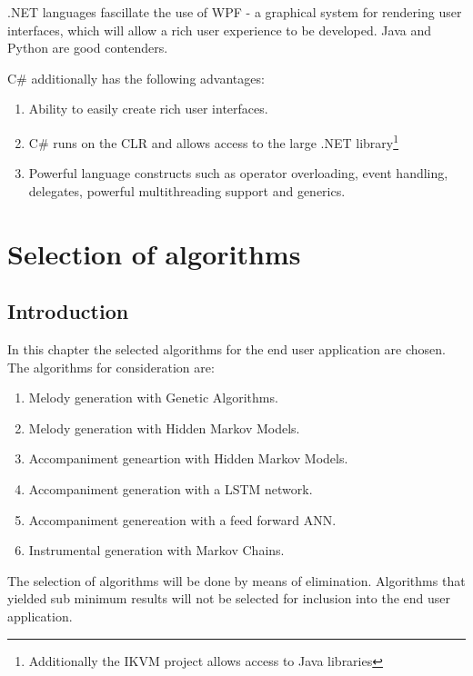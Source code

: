 .NET languages fascillate the use of \ac{WPF} - a graphical system for rendering user interfaces, which will allow a rich user experience to be developed. Java and Python are good contenders.

C\# additionally has the following advantages:
\begin{enumerate}
\item Ability to easily create rich user interfaces.
\item C\# runs on the CLR and allows access to the large .NET library\footnote{Additionally the IKVM project allows access to Java libraries}
\item Powerful language constructs such as operator overloading, event handling, delegates, powerful multithreading support and generics.
\end{enumerate}


\chapter{Selection of algorithms}
\section{Introduction}
In this chapter the selected algorithms for the end user application are chosen.
The algorithms for consideration are:
\begin{enumerate}
\item Melody generation with Genetic Algorithms.
\item Melody generation with Hidden Markov Models.
\item Accompaniment geneartion with Hidden Markov Models.
\item Accompaniment generation with a \ac{LSTM} network.
\item Accompaniment genereation with a feed forward \ac{ANN}.
\item Instrumental generation with Markov Chains.
\end{enumerate}

The selection of algorithms will be done by means of elimination. Algorithms that yielded sub minimum results will not be selected for inclusion into the end user application.

